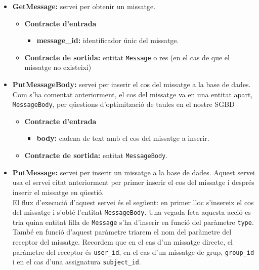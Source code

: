 		\begin{itemize}
			
			\item \textbf{GetMessage:} servei per obtenir un missatge.
			
			\begin{itemize}
					\item \textbf{Contracte d'entrada}
						\begin{itemize}
							\item \textbf{message\_id:} identificador únic del missatge.
						\end{itemize}
					\item \textbf{Contracte de sortida:} entitat \texttt{Message} o res (en el cas de que el missatge no existeixi)
			\end{itemize}
				
							
			\item \textbf{PutMessageBody:} servei per inserir el cos del missatge a la base de dades. Com s'ha comentat anteriorment, el cos del missatge va en una entitat apart, \texttt{MessageBody}, per qüestions d'optimització de taules en el nostre \ac{SGBD}
			
			\begin{itemize}
					\item \textbf{Contracte d'entrada}
						\begin{itemize}
							\item \textbf{body:} cadena de text amb el cos del missatge a inserir.
						\end{itemize}
					\item \textbf{Contracte de sortida:} entitat \texttt{MessageBody}.
			\end{itemize}

			\item \textbf{PutMessage:} servei per inserir un missatge a la base de dades. Aquest servei usa el servei citat anteriorment per primer inserir el cos del missatge i després inserir el missatge en qüestió.\\
			
			El flux d'execució d'aquest servei és el següent: en primer lloc s'insereix el cos del missatge i s'obté l'entitat \texttt{MessageBody}. Una vegada feta aquesta acció es tria quina entitat filla de \texttt{Message} s'ha d'inserir en funció del paràmetre \texttt{type}. \\
			
			També en funció d'aquest paràmetre triarem el nom del paràmetre del receptor del missatge. Recordem que en el cas d'un missatge directe, el paràmetre del receptor és \texttt{user\_id}, en el cas d'un missatge de grup, \texttt{group\_id} i en el cas d'una assignatura \texttt{subject\_id}.\\
			

\end{itemize}
